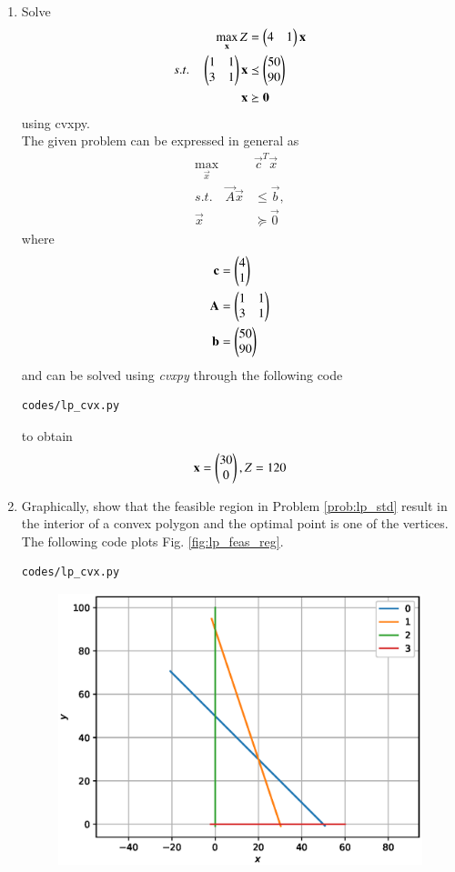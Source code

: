 \renewcommand{\theequation}{\theenumi}
\begin{enumerate}[label=\arabic*.,ref=\thesection.\theenumi]
%
\item Solve
\label{prob:lp_std}
\begin{align}
\max_{\mathbf{x}} Z &= \begin{pmatrix}4 & 1\end{pmatrix}\mathbf{x}
\\
s.t. \quad 
\begin{pmatrix}
1 & 1
\\
3 & 1
\end{pmatrix}
\mathbf{x} &\preceq \begin{pmatrix}50\\90\end{pmatrix}
\\
\mathbf{x} &\succeq \mathbf{0}
\end{align}
%
using cvxpy.
\\
\solution The given problem can be expressed in general as
\begin{align}
\max_{\vec{x}} &\vec{c}^{T}\vec{x}
\\
s.t. \quad \vec{A}\vec{x} &\le \vec{b},
\\
\vec{x} &\succeq\vec{0}
\end{align}
%
where
\begin{align}
\vec{c} &= \myvec{4 \\ 1}
\\
\vec{A} &=
\myvec{
1 & 1
\\
3 & 1
}
\\
\vec{b}&=\myvec{50\\90}
%
\end{align}
%
and can be solved using {\em cvxpy} through the following code
\begin{lstlisting}
codes/lp_cvx.py
\end{lstlisting}
%
to obtain
\begin{align}
\mathbf{x} = \begin{pmatrix}30\\0\end{pmatrix}, Z = 120
\end{align}
%
\item Graphically, show that the {feasible region} in  Problem \ref{prob:lp_std} result in the interior of a convex polygon and the optimal point is one of the vertices.
\solution The following code plots Fig. \ref{fig:lp_feas_reg}.
%
\begin{lstlisting}
codes/lp_cvx.py
\end{lstlisting}
%
\begin{figure}[!ht]
\includegraphics[width=\columnwidth]{./figs/lp_feas_reg.eps}

\end{figure}
\end{enumerate}
